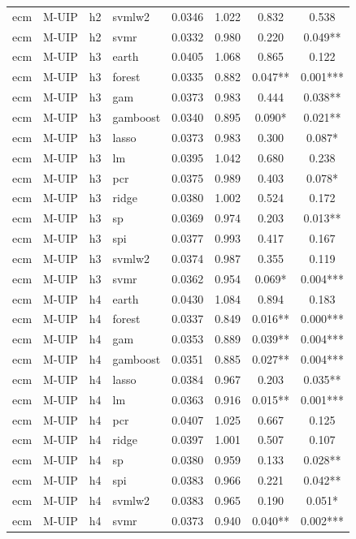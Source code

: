 \begin{ThreePartTable}
\begin{longtable}[t]{llclcccc}
ecm & M-UIP & h2 & svmlw2 & 0.0346 & 1.022 & 0.832 & 0.538\\
ecm & M-UIP & h2 & svmr & 0.0332 & 0.980 & 0.220 & 0.049**\\
\addlinespace
ecm & M-UIP & h3 & earth & 0.0405 & 1.068 & 0.865 & 0.122\\
ecm & M-UIP & h3 & forest & 0.0335 & 0.882 & 0.047** & 0.001***\\
ecm & M-UIP & h3 & gam & 0.0373 & 0.983 & 0.444 & 0.038**\\
ecm & M-UIP & h3 & gamboost & 0.0340 & 0.895 & 0.090* & 0.021**\\
ecm & M-UIP & h3 & lasso & 0.0373 & 0.983 & 0.300 & 0.087*\\
ecm & M-UIP & h3 & lm & 0.0395 & 1.042 & 0.680 & 0.238\\
ecm & M-UIP & h3 & pcr & 0.0375 & 0.989 & 0.403 & 0.078*\\
ecm & M-UIP & h3 & ridge & 0.0380 & 1.002 & 0.524 & 0.172\\
ecm & M-UIP & h3 & sp & 0.0369 & 0.974 & 0.203 & 0.013**\\
ecm & M-UIP & h3 & spi & 0.0377 & 0.993 & 0.417 & 0.167\\
ecm & M-UIP & h3 & svmlw2 & 0.0374 & 0.987 & 0.355 & 0.119\\
ecm & M-UIP & h3 & svmr & 0.0362 & 0.954 & 0.069* & 0.004***\\
\addlinespace
ecm & M-UIP & h4 & earth & 0.0430 & 1.084 & 0.894 & 0.183\\
ecm & M-UIP & h4 & forest & 0.0337 & 0.849 & 0.016** & 0.000***\\
ecm & M-UIP & h4 & gam & 0.0353 & 0.889 & 0.039** & 0.004***\\
ecm & M-UIP & h4 & gamboost & 0.0351 & 0.885 & 0.027** & 0.004***\\
ecm & M-UIP & h4 & lasso & 0.0384 & 0.967 & 0.203 & 0.035**\\
ecm & M-UIP & h4 & lm & 0.0363 & 0.916 & 0.015** & 0.001***\\
ecm & M-UIP & h4 & pcr & 0.0407 & 1.025 & 0.667 & 0.125\\
ecm & M-UIP & h4 & ridge & 0.0397 & 1.001 & 0.507 & 0.107\\
ecm & M-UIP & h4 & sp & 0.0380 & 0.959 & 0.133 & 0.028**\\
ecm & M-UIP & h4 & spi & 0.0383 & 0.966 & 0.221 & 0.042**\\
ecm & M-UIP & h4 & svmlw2 & 0.0383 & 0.965 & 0.190 & 0.051*\\
ecm & M-UIP & h4 & svmr & 0.0373 & 0.940 & 0.040** & 0.002***\\

\end{longtable}
\end{ThreePartTable}
